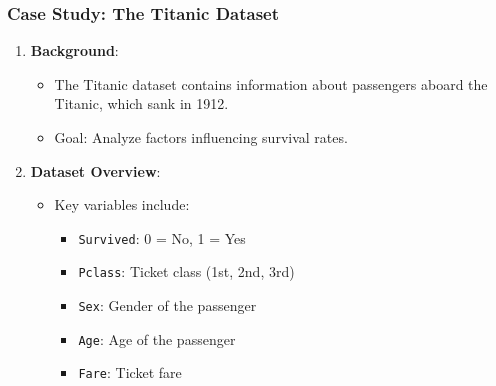 \documentclass[aspectratio=169]{beamer}
\begin{document}
\begin{frame}[fragile]
    \frametitle{Case Study: The Titanic Dataset}
    \begin{enumerate}
        \item \textbf{Background}:
        \begin{itemize}
            \item The Titanic dataset contains information about passengers aboard the Titanic, which sank in 1912.
            \item Goal: Analyze factors influencing survival rates.
        \end{itemize}
        
        \item \textbf{Dataset Overview}:
        \begin{itemize}
            \item Key variables include:
            \begin{itemize}
                \item \texttt{Survived}: 0 = No, 1 = Yes
                \item \texttt{Pclass}: Ticket class (1st, 2nd, 3rd)
                \item \texttt{Sex}: Gender of the passenger
                \item \texttt{Age}: Age of the passenger
                \item \texttt{Fare}: Ticket fare
            \end{itemize}
        \end{itemize}
    \end{enumerate}
\end{frame}
\end{document}
